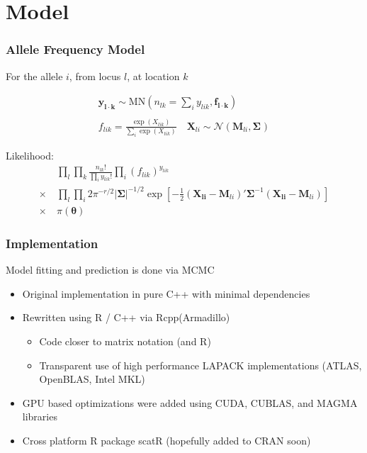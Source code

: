 \documentclass[slidestop,mathserif]{beamer}
\begin{document}
\section{Model}

\begin{frame}
\frametitle{Allele Frequency Model}

For the allele $i$, from locus $l$, at location $k$

\begin{align*}
\bm{y_{l \cdot k}} \sim \text{MN}\left(n_{lk}=\textstyle\sum_i y_{lik}, \bm{f_{l \cdot k}}\right) \\
\\
f_{lik} = \frac{\exp(X_{lik})}{\sum_i \exp(X_{lik})} \quad
\bm{X}_{li} \sim \mathcal{N}( \bm{M}_{li}, \bm{\Sigma_{}})
\end{align*}

\pause

Likelihood:
\begin{align*}
       &~\prod_l \prod_k \frac{n_{lk}!}{\prod_i y_{lik}!} \textstyle\prod_i (f_{lik})^{y_{lik}} \\
\times &~\prod_l \prod_i 2\pi^{-r/2} |\bm\Sigma|^{-1/2} \exp\left[ -\frac{1}{2}(\bm{X_{li}} - \bm{M}_{li})'\bm\Sigma^{-1} (\bm{X_{li}} - \bm{M}_{li}) \right]\\
\times &~\pi(\bm\theta)
\end{align*}

\end{frame}


\begin{frame}
\frametitle{Implementation}

Model fitting and prediction is done via MCMC
\begin{itemize} \addtolength{\itemsep}{3mm}
\item Original implementation in pure C++ with minimal dependencies
\item Rewritten using R / C++ via Rcpp(Armadillo) 
\begin{itemize}
\item Code closer to matrix notation (and R)
\item Transparent use of high performance LAPACK implementations (ATLAS, OpenBLAS, Intel MKL)
\end{itemize}
\item GPU based optimizations were added using CUDA, CUBLAS, and MAGMA libraries
\item Cross platform R package scatR (hopefully added to CRAN soon)
\end{itemize}

\end{frame}
\end{document}
